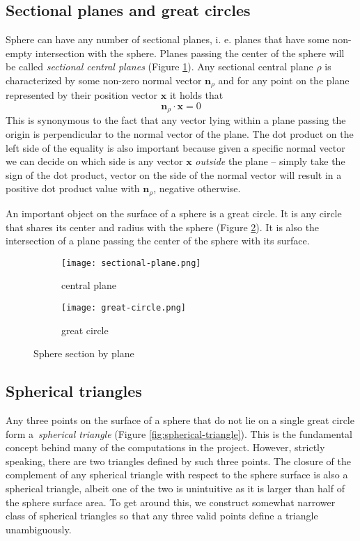 \subsection{Sectional planes and great circles}
Sphere can have any number of sectional planes, i. e. planes that have some non-empty intersection with the sphere. Planes passing the center of the sphere will be called \textit{sectional central planes} (Figure \ref{fig:sectional-plane}). Any sectional central plane $\rho$ is characterized by some non-zero normal vector $\textbf{n}_\rho$ and for any point on the plane represented by their position vector $\mathbf{x}$ it holds that
$$\mathbf{n}_\rho\cdot\mathbf{x}=0$$
This is synonymous to the fact that any vector lying within a plane passing the origin is perpendicular to the normal vector of the plane. The dot product on the left side of the equality is also important because given a specific normal vector we can decide on which side is any vector $\mathbf{x}$ \textit{outside} the plane -- simply take the sign of the dot product, vector on the side of the normal vector will result in a positive dot product value with $\mathbf{n}_\rho$, negative otherwise.

An important object on the surface of a sphere is a great circle. It is any circle that shares its center and radius with the sphere (Figure \ref{fig:great-circle}). It is also the intersection of a plane passing the center of the sphere with its surface.
\begin{figure}[ht]
\centering
\begin{subfigure}{7cm}
\texttt{[image: sectional-plane.png]}
\caption{central plane}
\label{fig:sectional-plane}
\end{subfigure}
\begin{subfigure}{7cm}
\texttt{[image: great-circle.png]}
\caption{great circle}
\label{fig:great-circle}
\end{subfigure}
\caption{Sphere section by plane}
\label{fig:sectional-objects}
\end{figure}

\subsection{Spherical triangles}
Any three points on the surface of a sphere that do not lie on a single great circle form a~\textit{spherical triangle} (Figure \ref{fig:spherical-triangle}). This is the fundamental concept behind many of the computations in the project. However, strictly speaking, there are two triangles defined by such three points. The closure of the complement of any spherical triangle with respect to the sphere surface is also a spherical triangle, albeit one of the two is unintuitive as it is larger than half of the sphere surface area. To get around this, we construct somewhat narrower class of spherical triangles so that any three valid points define a triangle unambiguously.

